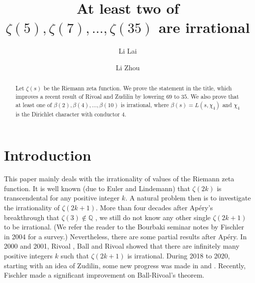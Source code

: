\documentclass[11pt]{amsart}
\numberwithin{equation}{section}
\begin{document}
\title {At least two of $\zeta(5), \zeta(7), \ldots, \zeta(35)$ are irrational}

\author{Li Lai}
\address{Department of Mathematical Sciences, Tsinghua University \\ Beijing, China}

\author{Li Zhou}
\address{School of Mathematical Sciences, Fudan University \\ Shanghai, China}


\begin{abstract}
Let $\zeta(s)$ be the Riemann zeta function. We prove the statement in the title, which improves a recent result of Rivoal and Zudilin by lowering $69$ to $35$. We also prove that at least one of $\beta(2),\beta(4),\ldots,\beta(10)$ is irrational, where $\beta(s) = L(s,\chi_4)$ and $\chi_4$ is the Dirichlet character with conductor $4$.
\end{abstract}


\maketitle




\section{Introduction}
This paper mainly deals with the irrationality of values of the Riemann zeta function. It is well known (due to Euler and Lindemann) that $\zeta(2k)$ is transcendental for any positive integer $k$. A natural problem then is to investigate the irrationality of $\zeta(2k+1)$. More than four decades after Ap{\'e}ry's breakthrough that $\zeta(3) \notin \mathbb{Q}$ \cite{Ap79}, we still do not know any other single $\zeta(2k+1)$ to be irrational. (We refer the reader to the Bourbaki seminar notes \cite{Fi04} by Fischler in 2004 for a survey.) Nevertheless, there are some partial results after Ap{\'e}ry. In 2000 and 2001, Rivoal \cite{Ri00}, Ball and Rivoal \cite{BR01} showed that there are infinitely many positive integers $k$ such that $\zeta(2k+1)$ is irrational. During 2018 to 2020, starting with an idea of Zudilin, some new progress was made in \cite{FSZ19} and \cite{LY20}. Recently, Fischler \cite{Fi21} made a significant improvement on Ball-Rivoal's theorem.
\end{document}
